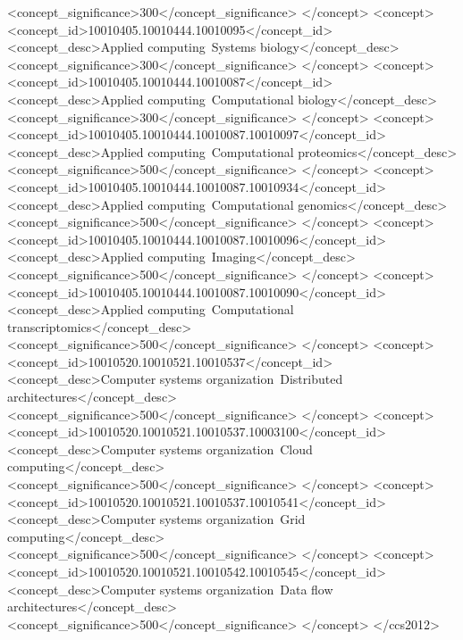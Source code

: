 \documentclass[sigconf,revew,screen,timestamp,nonacm]{acmart}
\begin{document}
\begin{CCSXML}
       <concept_significance>300</concept_significance>
       </concept>
   <concept>
       <concept_id>10010405.10010444.10010095</concept_id>
       <concept_desc>Applied computing~Systems biology</concept_desc>
       <concept_significance>300</concept_significance>
       </concept>
   <concept>
       <concept_id>10010405.10010444.10010087</concept_id>
       <concept_desc>Applied computing~Computational biology</concept_desc>
       <concept_significance>300</concept_significance>
       </concept>
   <concept>
       <concept_id>10010405.10010444.10010087.10010097</concept_id>
       <concept_desc>Applied computing~Computational proteomics</concept_desc>
       <concept_significance>500</concept_significance>
       </concept>
   <concept>
       <concept_id>10010405.10010444.10010087.10010934</concept_id>
       <concept_desc>Applied computing~Computational genomics</concept_desc>
       <concept_significance>500</concept_significance>
       </concept>
   <concept>
       <concept_id>10010405.10010444.10010087.10010096</concept_id>
       <concept_desc>Applied computing~Imaging</concept_desc>
       <concept_significance>500</concept_significance>
       </concept>
   <concept>
       <concept_id>10010405.10010444.10010087.10010090</concept_id>
       <concept_desc>Applied computing~Computational transcriptomics</concept_desc>
       <concept_significance>500</concept_significance>
       </concept>
   <concept>
       <concept_id>10010520.10010521.10010537</concept_id>
       <concept_desc>Computer systems organization~Distributed architectures</concept_desc>
       <concept_significance>500</concept_significance>
       </concept>
   <concept>
       <concept_id>10010520.10010521.10010537.10003100</concept_id>
       <concept_desc>Computer systems organization~Cloud computing</concept_desc>
       <concept_significance>500</concept_significance>
       </concept>
   <concept>
       <concept_id>10010520.10010521.10010537.10010541</concept_id>
       <concept_desc>Computer systems organization~Grid computing</concept_desc>
       <concept_significance>500</concept_significance>
       </concept>
   <concept>
       <concept_id>10010520.10010521.10010542.10010545</concept_id>
       <concept_desc>Computer systems organization~Data flow architectures</concept_desc>
       <concept_significance>500</concept_significance>
       </concept>
 </ccs2012>
\end{CCSXML}
\end{document}

